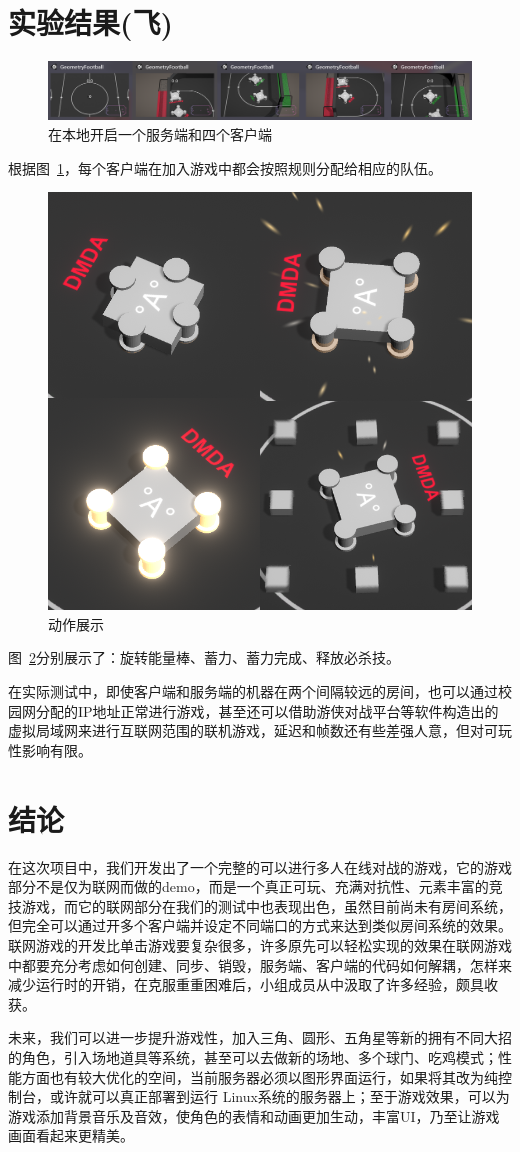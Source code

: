 \documentclass[conference]{IEEEtran}
\begin{document}
\section{实验结果(飞)}

\begin{figure}[htbp]
  \centerline{\includegraphics[width=.46\textwidth]{images/result1.png}}
  \caption{在本地开启一个服务端和四个客户端}
  \label{fig:result1}
\end{figure}
  根据图~\ref{fig:result1}，每个客户端在加入游戏中都会按照规则分配给相应的队伍。

\begin{figure}[htbp]
  \centerline{\includegraphics[width=.32\textwidth]{images/result2.png}}
  \caption{动作展示}
  \label{fig:result2}
\end{figure}
  图~\ref{fig:result2}分别展示了：旋转能量棒、蓄力、蓄力完成、释放必杀技。

  在实际测试中，即使客户端和服务端的机器在两个间隔较远的房间，也可以通过校园网分配的IP地址正常进行游戏，甚至还可以借助游侠对战平台等软件构造出的虚拟局域网来进行互联网范围的联机游戏，延迟和帧数还有些差强人意，但对可玩性影响有限。

\section{结论}
在这次项目中，我们开发出了一个完整的可以进行多人在线对战的游戏，它的游戏部分不是仅为联网而做的demo，而是一个真正可玩、充满对抗性、元素丰富的竞技游戏，而它的联网部分在我们的测试中也表现出色，虽然目前尚未有房间系统，但完全可以通过开多个客户端并设定不同端口的方式来达到类似房间系统的效果。联网游戏的开发比单击游戏要复杂很多，许多原先可以轻松实现的效果在联网游戏中都要充分考虑如何创建、同步、销毁，服务端、客户端的代码如何解耦，怎样来减少运行时的开销，在克服重重困难后，小组成员从中汲取了许多经验，颇具收获。

未来，我们可以进一步提升游戏性，加入三角、圆形、五角星等新的拥有不同大招的角色，引入场地道具等系统，甚至可以去做新的场地、多个球门、吃鸡模式；性能方面也有较大优化的空间，当前服务器必须以图形界面运行，如果将其改为纯控制台，或许就可以真正部署到运行 Linux系统的服务器上；至于游戏效果，可以为游戏添加背景音乐及音效，使角色的表情和动画更加生动，丰富UI，乃至让游戏画面看起来更精美。




\end{document}
